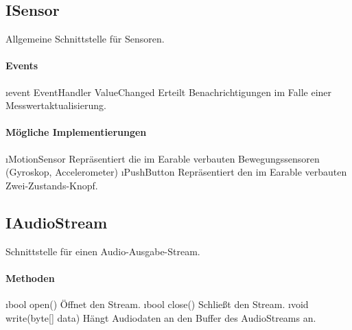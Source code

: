 \documentclass[../entwurf.tex]{subfiles}
\begin{document}
\subsection{ISensor}
Allgemeine Schnittstelle für Sensoren.
\paragraph{Events}
\begin{itemize}
	\i{event EventHandler ValueChanged} Erteilt Benachrichtigungen im Falle einer Messwertaktualisierung.
\end{itemize}
\paragraph{Mögliche Implementierungen}
\begin{itemize}
	\i{MotionSensor} Repräsentiert die im Earable verbauten Bewegungssensoren (Gyroskop, Accelerometer)
	\i{PushButton} Repräsentiert den im Earable verbauten Zwei-Zustands-Knopf.
\end{itemize}

\subsection{IAudioStream}
Schnittstelle für einen Audio-Ausgabe-Stream.
\paragraph{Methoden}
\begin{itemize}
	\i{bool open()} Öffnet den Stream.
	\i{bool close()} Schließt den Stream.
	\i{void write(byte[] data)} Hängt Audiodaten an den Buffer des AudioStreams an.
\end{itemize}
\end{document}
